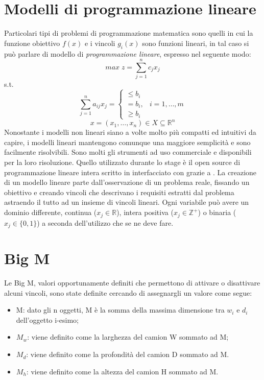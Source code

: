 \section{Modelli di programmazione lineare}
Particolari tipi di problemi di programmazione matematica sono quelli in cui la funzione obiettivo $f(x)$ e i vincoli $g_i(x)$ sono funzioni lineari, in tal caso si può parlare di modello di \textit{programmazione lineare}, espresso nel seguente modo:
$$ max\; z = \sum_{j=1}^n c_j x_j $$
s.t.
$$\sum_{j=1}^n a_{ij} x_j = \begin{cases} \leq b_i \\ = b_i, & i = 1,\dots,m \\ \geq b_i \end{cases}$$
$$x = (x_1,\dots,x_n) \in X \subseteq \mathbb{R}^n$$
Nonostante i modelli non lineari siano a volte molto più compatti ed intuitivi da capire, i modelli lineari mantengono comunque una maggiore semplicità e sono facilmente risolvibili. Sono molti gli strumenti ad uso commerciale e  disponibili per la loro risoluzione. Quello utilizzato durante lo stage è il  open source di programmazione lineare intera  scritto in  interfacciato con  grazie a . La creazione di un modello lineare parte dall'osservazione di un problema reale, fissando un obiettivo e creando vincoli che descrivano i requisiti estratti dal problema astraendo il tutto ad un insieme di vincoli lineari.
Ogni variabile può avere un dominio differente, continua ($x_j \in \mathbb{R}$), intera positiva ($x_j \in \mathbb{Z}^+$) o binaria ($x_j \in \{0,1\}$) a seconda dell'utilizzo che se ne deve fare.
\section{Big M}
Le Big M, valori opportunamente definiti che permettono di attivare o disattivare alcuni vincoli, sono state definite cercando di assegnargli un valore come segue:
\begin{itemize}
	\item M: dato gli n oggetti, M è la somma della massima dimensione tra $w_i$ e $d_i$ dell'oggetto i-esimo;
	\item $M_w$: viene definito come la larghezza del camion W sommato ad M;
	\item $M_d$: viene definito come la profondità del camion D sommato ad M.
	\item $M_h$: viene definito come la altezza del camion H sommato ad M.
\end{itemize}

